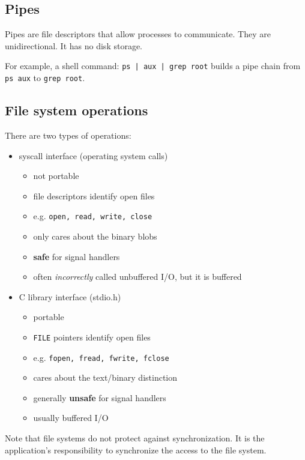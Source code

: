 \documentclass[letterpaper,12pt]{article}
\begin{document}
\subsection{Pipes}
Pipes are file descriptors that allow processes to communicate. They are unidirectional. It has no disk storage. 

For example, a shell command: \texttt{ps | aux | grep root} builds a pipe chain from \texttt{ps aux} to \texttt{grep root}.

\subsection{File system operations}
There are two types of operations:
\begin{itemize}
    \item syscall interface (operating system calls)\begin{itemize}
        \item not portable
        \item file descriptors identify open files 
        \item e.g. \texttt{open, read, write, close}
        \item only cares about the binary blobs
        \item \textbf{safe} for signal handlers
        \item often \textit{incorrectly} called unbuffered I/O, but it is buffered
    \end{itemize}
    \item C library interface (stdio.h)\begin{itemize}
        \item portable
        \item \texttt{FILE} pointers identify open files
        \item e.g. \texttt{fopen, fread, fwrite, fclose}
        \item cares about the text/binary distinction
        \item generally \textbf{unsafe} for signal handlers
        \item usually buffered I/O
    \end{itemize} 
\end{itemize}
Note that file systems do not protect against synchronization. It is the application's responsibility to synchronize the access to the file system.
\end{document}
